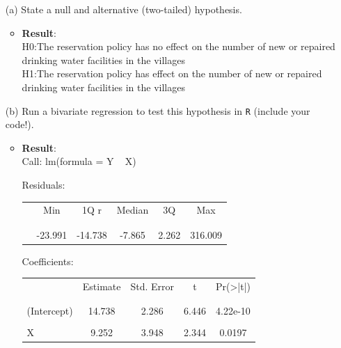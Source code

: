 \documentclass[12pt,letterpaper]{article}
\begin{document}
\newpage
\begin{enumerate}
	\item [(a)] State a null and alternative (two-tailed) hypothesis. 
	\begin{itemize}
		\item \textbf{Result}:\\
	H0:The reservation policy has no effect on the number of new or repaired drinking water facilities in the villages\\
	H1:The reservation policy has effect on the number of new or repaired drinking water facilities in the villages
	\end{itemize}
	\vspace{1cm}
	\item [(b)] Run a bivariate regression to test this hypothesis in \texttt{R} (include your code!).
		
	\begin{itemize}
		\item \textbf{Result}:\\
		Call:
		lm(formula = Y ~ X)
		 
		Residuals:
		           
		   
			\begin{table}[h]
			\centering
			\begin{tabular}{l | c c c c c}
				& Min   & 1Q  r &Median   & 3Q  &Max   \\
				\\[-1.8ex] 
				\hline \\[-1.8ex]
				  & -23.991&-14.738  &  -7.865   &2.262 &316.009 \\
				                                 
			\end{tabular}
		\end{table}
		Coefficients: 
			\begin{table}[h]
			\centering
			\begin{tabular}{l | c c c c }
				& Estimate & Std. Error & t &  Pr(>|t|) \\
				\\[-1.8ex] 
				\hline \\[-1.8ex]
			(Intercept)  & 14.738 & 2.286  &  6.446 &4.22e-10  \\
				\\
				X  &9.252 & 3.948  & 2.344 & 0.0197\\
				
			\end{tabular}
		\end{table}


\end{itemize}
\end{enumerate}
\end{document}
